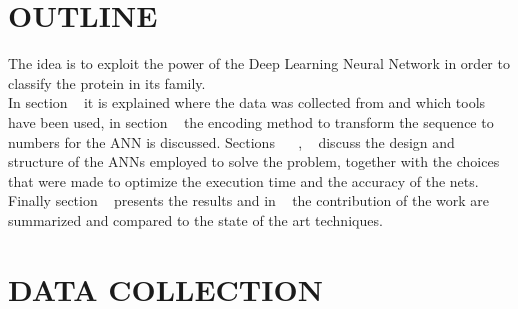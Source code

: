\documentclass[a4paper, 10pt, conference]{ieeeconf}      %
\begin{document}

\newpage

\section{OUTLINE}
The idea is to exploit the power of the Deep Learning Neural Network in order to classify the protein in its family.\\
In section ~ it is explained where the data was collected from and which tools have been used, in section ~ the encoding method to transform the sequence to numbers for the ANN is discussed.
Sections  ~ ~, ~ discuss the design and structure of the ANNs employed to solve the problem, together with the choices that were made to optimize the execution time and the accuracy of the nets. Finally section ~ presents the results and in ~ the contribution of the work are summarized and compared to the state of the art techniques.
\section{DATA COLLECTION}\label{sec:collection}
\end{document}
